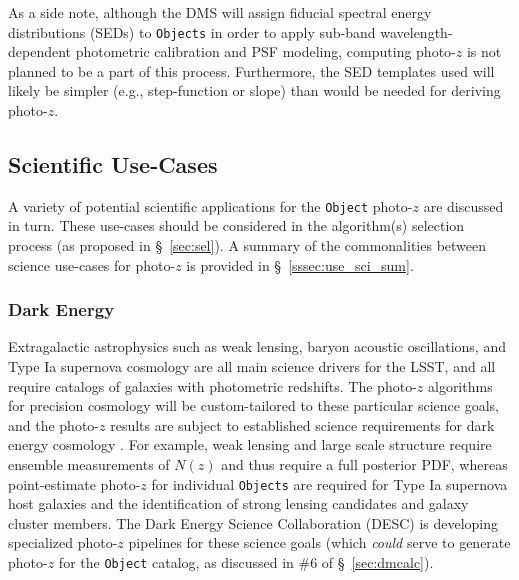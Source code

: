 \documentclass[DM,lsstdraft,toc]{lsstdoc}
\begin{document}
As a side note, although the DMS will assign fiducial spectral energy distributions (SEDs) to {\tt Objects} in order to apply sub-band wavelength-dependent photometric calibration and PSF modeling, computing photo-$z$ is not planned to be a part of this process.
Furthermore, the SED templates used will likely be simpler (e.g., step-function or slope) than would be needed for deriving photo-$z$.

\subsection{Scientific Use-Cases}\label{ssec:use_sci}

A variety of potential scientific applications for the {\tt Object} photo-$z$ are discussed in turn. 
These use-cases should be considered in the algorithm(s) selection process (as proposed in \S~\ref{sec:sel}).
A summary of the commonalities between science use-cases for photo-$z$ is provided in \S~\ref{sssec:use_sci_sum}.

\subsubsection{Dark Energy}\label{sssec:use_sci_de}
Extragalactic astrophysics such as weak lensing, baryon acoustic oscillations, and Type Ia supernova cosmology are all main science drivers for the LSST, and all require catalogs of galaxies with photometric redshifts.
The photo-$z$ algorithms for precision cosmology will be custom-tailored to these particular science goals, and the photo-$z$ results are subject to established science requirements for dark energy cosmology \citep{2018arXiv180901669T}.
For example, weak lensing and large scale structure require ensemble measurements of $N(z)$ and thus require a full posterior PDF, whereas point-estimate photo-$z$ for individual {\tt Objects} are required for Type Ia supernova host galaxies and the identification of strong lensing candidates and galaxy cluster members. 
The Dark Energy Science Collaboration (DESC) is developing specialized photo-$z$ pipelines for these science goals (which {\it could} serve to generate photo-$z$ for the {\tt Object} catalog, as discussed in \#6 of \S~\ref{sec:dmcalc}).
\end{document}
